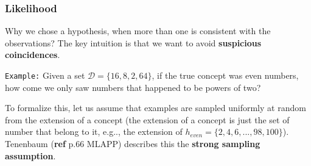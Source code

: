 \documentclass{article}
\makeatletter
\DeclareRobustCommand\onedot{\futurelet\@let@token\@onedot}
\def\@onedot{\ifx\@let@token.\else.\null\fi\xspace}
\def\eg{e.g\onedot} \def\Eg{E.g\onedot}
\makeatother
\begin{document}
\subsubsection{Likelihood}

Why we chose a hypothesis, when more than one is consistent with the observations? The key intuition is that we want to avoid \textbf{suspicious coincidences}. 
\newline

\texttt{Example:}
Given a set $\mathcal{D} = \{16,8,2,64\}$, if the true concept was even numbers, how come we only saw numbers that happened to be powers of two?

To formalize this, let us assume that examples are sampled uniformly at random from the extension of a concept (the extension of a concept is just the set of number that belong to it, \eg, the extension of $h_{even} = \{2,4,6,...,98,100\}$).
Tenenbaum (\textbf{ref} p.66 MLAPP) describes this the \textbf{strong sampling assumption}.



\printbibliography
\end{document}
